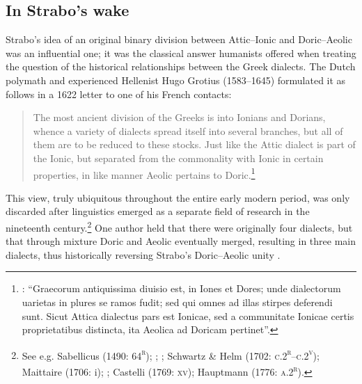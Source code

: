 \subsection{In Strabo’s wake}
\hypertarget{Toc19704836}{}
Strabo’s idea of an original binary division between Attic–Ionic and Doric–Aeolic was an influential one; it was the classical answer humanists offered when treating the question of the historical relationships between the Greek dialects. The Dutch polymath and experienced Hellenist Hugo Grotius (1583–1645) formulated it as follows in a 1622 letter to one of his French contacts:

\begin{quote}
The most ancient division of the Greeks is into Ionians and Dorians, whence a variety of dialects spread itself into several branches, but all of them are to be reduced to these stocks. Just like the Attic dialect is part of the Ionic, but separated from the commonality with Ionic in certain properties, in like manner Aeolic pertains to Doric.\footnote{\citet[143]{Grotius1648}: “Graecorum antiquissima diuisio est, in Iones et Dores; unde dialectorum uarietas in plures se ramos fudit; sed qui omnes ad illas stirpes deferendi sunt. Sicut Attica dialectus pars est Ionicae, sed a communitate Ionicae certis proprietatibus distincta, ita Aeolica ad Doricam pertinet”.}
\end{quote}

This view, truly ubiquitous throughout the entire early modern period, was only discarded after linguistics emerged as a separate field of research in the nineteenth century.\footnote{See e.g. Sabellicus (1490: 64\textsc{\textsuperscript{r}}); \citet[235]{Estienne1573}; \citet[563]{Lancelot1655}; Schwartz \& Helm (1702: \textsc{c.2}\textsc{\textsuperscript{r}}–\textsc{c.2}\textsc{\textsuperscript{v}}); Maittaire (1706: i); \citet[82]{Vitringa1712}; Castelli (1769: \textsc{xv}); Hauptmann (1776: \textsc{a.2}\textsc{\textsuperscript{r}}).} One author held that there were originally four dialects, but that through mixture Doric and Aeolic eventually merged, resulting in three main dialects, thus historically reversing Strabo’s Doric–Aeolic unity \citep[20]{Gedike1782}.

